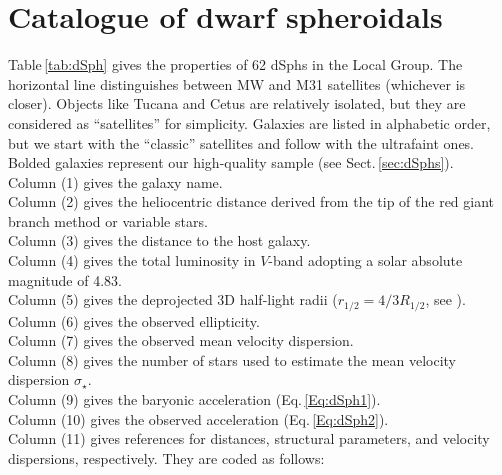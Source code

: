 \documentclass[apjl, twocolappendix]{emulateapj}
\begin{document}


\section{Catalogue of dwarf spheroidals}\label{sec:Catalogue}

Table\,\ref{tab:dSph} gives the properties of 62 dSphs in the Local Group. The horizontal line distinguishes between MW and M31 satellites (whichever is closer). Objects like Tucana and Cetus are relatively isolated, but they are considered as ``satellites'' for simplicity. Galaxies are listed in alphabetic order, but we start with the ``classic'' satellites and follow with the ultrafaint ones. Bolded galaxies represent our high-quality sample (see Sect.\,\ref{sec:dSphs}). \\
Column (1) gives the galaxy name.\\
Column (2) gives the heliocentric distance derived from the tip of the red giant branch method or variable stars.\\
Column (3) gives the distance to the host galaxy.\\
Column (4) gives the total luminosity in $V$-band adopting a solar absolute magnitude of 4.83.\\
Column (5) gives the deprojected 3D half-light radii ($r_{1/2} = 4/3 R_{1/2}$, see \citealt{Wolf2010}).\\
Column (6) gives the observed ellipticity.\\
Column (7) gives the observed mean velocity dispersion.\\
Column (8) gives the number of stars used to estimate the mean velocity dispersion $\sigma_{\star}$.\\
Column (9) gives the baryonic acceleration (Eq.\,\ref{Eq:dSph1}).\\
Column (10) gives the observed acceleration (Eq.\,\ref{Eq:dSph2}).\\
Column (11) gives references for distances, structural parameters, and velocity dispersions, respectively. They are coded as follows:
\end{document}
